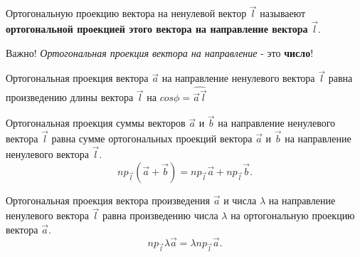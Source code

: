 \begin{definition}
  Ортогональную проекцию вектора на ненулевой вектор $\vec{l}$ называеют \textbf{ортогональной проекцией этого вектора на направление вектора} $\vec{l}$.
\end{definition}

\begin{note}
  Важно! \textit{Ортогональная проекция вектора на направление} - это \textbf{число}!
\end{note}

\begin{theorem}
  Ортогональная проекция вектора $\vec{a}$ на направление ненулевого вектора $\vec{l}$ равна произведению длины вектора $\vec{l}$ на $cos \phi = \widehat{\vec{a}\vec{l}}$
\end{theorem}

\begin{theorem}
  Ортогональная проекция суммы векторов $\vec{a}$ и $\vec{b}$ на направление ненулевого вектора $\vec{l}$ равна сумме ортогональных проекций вектора $\vec{a}$ и $\vec{b}$ на направление ненулевого вектора $\vec{l}$.
  \[
    np_{\vec{l}}\left( \vec{a} + \vec{b} \right) = np_{\vec{l}}\vec{a} + np_{\vec{l}}\vec{b}
  .\] 
\end{theorem}

\begin{theorem}
  Ортогональная проекция вектора произведения $\vec{a}$ и числа $\lambda$ на направление ненулевого вектора $\vec{l}$ равна произведению числа $\lambda$ на ортогональную проекцию вектора $\vec{a}$.
  \[
    np_{\vec{l}} \lambda\vec{a} = \lambda np_{\vec{l}} \vec{a}
  .\] 
\end{theorem}


